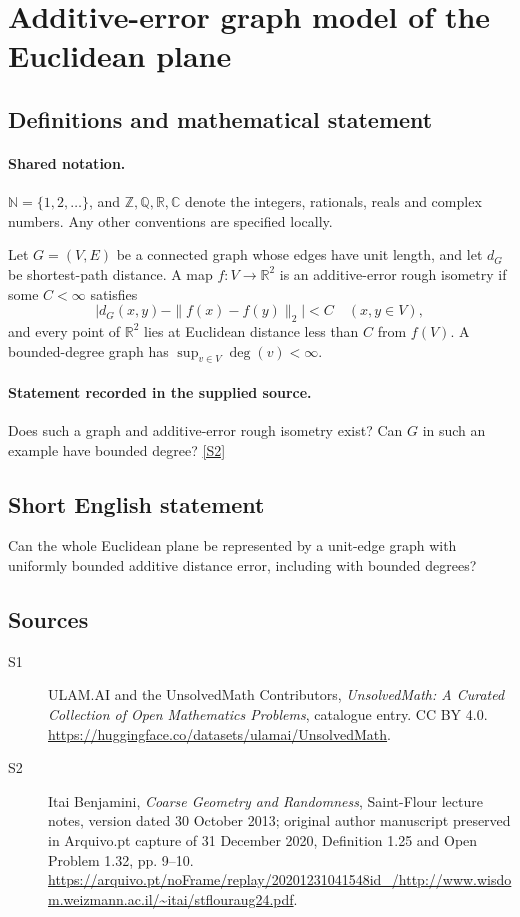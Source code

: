 \documentclass[11pt]{article}
\newcommand{\sref}[2]{\hyperlink{source:#1:#2}{[S#2]}}
\begin{document}
\section{Additive-error graph model of the Euclidean plane}\label{statement}

\subsection{Definitions and mathematical statement}

\paragraph{Shared notation.}$\mathbb N=\{1,2,\ldots\}$, and $\mathbb Z,\mathbb Q,\mathbb R,\mathbb C$ denote the integers, rationals, reals and complex numbers. Any other conventions are specified locally.


Let $G=(V,E)$ be a connected graph whose edges have unit length, and let $d_G$ be shortest-path distance. A map $f:V\to\mathbb R^2$ is an additive-error rough isometry if some $C<\infty$ satisfies
\[\bigl|d_G(x,y)-\|f(x)-f(y)\|_2\bigr|<C\quad(x,y\in V),\]
and every point of $\mathbb R^2$ lies at Euclidean distance less than $C$ from $f(V)$. A bounded-degree graph has $\sup_{v\in V}\deg(v)<\infty$.
\paragraph{Statement recorded in the supplied source.}
Does such a graph and additive-error rough isometry exist? Can $G$ in such an example have bounded degree? \sref{statement}{2}
\subsection{Short English statement}
Can the whole Euclidean plane be represented by a unit-edge graph with uniformly bounded additive distance error, including with bounded degrees?
\subsection{Sources}
\begin{description}
\item[\hypertarget{source:statement:1}{S1}] ULAM.AI and the UnsolvedMath Contributors, \emph{UnsolvedMath: A Curated Collection of Open Mathematics Problems}, catalogue entry. CC BY 4.0. \url{https://huggingface.co/datasets/ulamai/UnsolvedMath}.
\item[\hypertarget{source:statement:2}{S2}] Itai Benjamini, \emph{Coarse Geometry and Randomness}, Saint-Flour lecture notes, version dated 30 October 2013; original author manuscript preserved in Arquivo.pt capture of 31 December 2020, Definition 1.25 and Open Problem 1.32, pp. 9--10. \url{https://arquivo.pt/noFrame/replay/20201231041548id_/http://www.wisdom.weizmann.ac.il/~itai/stflouraug24.pdf}.
\end{description}
\label{end:statement}
\end{document}
